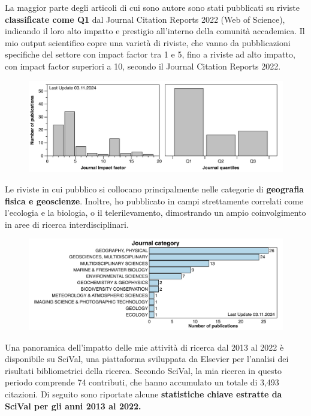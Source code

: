 \documentclass[11pt]{article}
\begin{document}
\newpage

{\normalfont La maggior parte degli articoli di cui sono autore sono stati pubblicati su riviste \textbf{classificate come Q1} dal Journal Citation Reports 2022 (Web of Science), indicando il loro alto impatto e prestigio all'interno della comunità accademica. Il mio output scientifico copre una varietà di riviste, che vanno da pubblicazioni specifiche del settore con impact factor tra 1 e 5, fino a riviste ad alto impatto, con impact factor superiori a 10, secondo il Journal Citation Reports 2022.}

\begin{figure}[h]
\centering
\includegraphics[width=\textwidth]{img/Quantiles.pdf}
\end{figure}

{\normalfont Le riviste in cui pubblico si collocano principalmente nelle categorie di \textbf{geografia fisica e geoscienze}. Inoltre, ho pubblicato in campi strettamente correlati come l'ecologia e la biologia, o il telerilevamento, dimostrando un ampio coinvolgimento in aree di ricerca interdisciplinari.}

\begin{figure}[h]
\centering
\includegraphics[width=\textwidth]{img/topics.pdf}
\end{figure}
\newpage
{\normalfont Una panoramica dell'impatto delle mie attività di ricerca dal 2013 al 2022 è disponibile su SciVal, una piattaforma sviluppata da Elsevier per l'analisi dei risultati bibliometrici della ricerca. Secondo SciVal, la mia ricerca in questo periodo comprende 74 contributi, che hanno accumulato un totale di 3,493 citazioni. Di seguito sono riportate alcune \textbf{statistiche chiave estratte da SciVal per gli anni 2013 al 2022.}}
\smallskip
\end{document}
